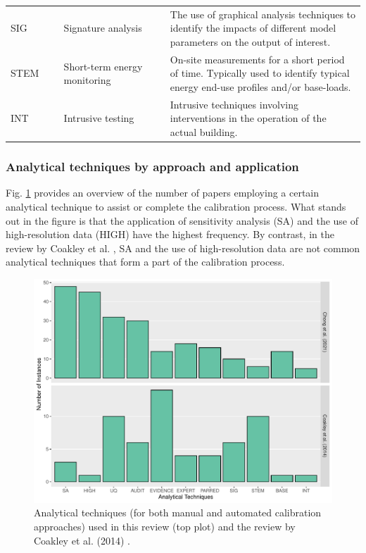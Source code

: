 \documentclass[review]{elsarticle}
\begin{document}
\begin{table}[h!]
{\begin{tabular}{p{0.15\linewidth} p{0.3\linewidth} p{0.85\linewidth}}
  SIG & Signature analysis & The use of graphical analysis techniques to identify the impacts of different model parameters on the output of interest. \\
  STEM & Short-term energy monitoring & On-site measurements for a short period of time. Typically used to identify typical energy end-use profiles and/or base-loads. \\
  INT & Intrusive testing & Intrusive techniques involving interventions in the operation of the actual building. \\
  \hline
\end{tabular}}
\end{table}

\subsubsection{Analytical techniques by approach and application}

Fig. \ref{fig:analytical} provides an overview of the number of papers employing a certain analytical technique to assist or complete the calibration process. What stands out in the figure is that the application of sensitivity analysis (SA) and the use of high-resolution data (HIGH) have the highest frequency. By contrast, in the review by Coakley et al. \cite{coakley2014review}, SA and the use of high-resolution data are not common analytical techniques that form a part of the calibration process.

\begin{figure}[!h]
\centering
\includegraphics[width=\textwidth]{figures/analytical.pdf}
\caption{Analytical techniques (for both manual and automated calibration approaches) used in this review (top plot) and the review by Coakley et al. (2014) \cite{coakley2014review}.}
\label{fig:analytical}
\end{figure}
\end{document}
